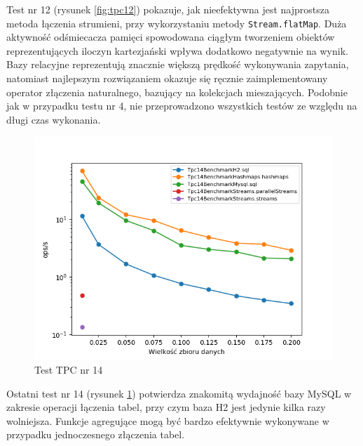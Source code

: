 \documentclass[12pt,twoside,openright]{extarticle}
\begin{document}
    Test nr 12 (rysunek \ref{fig:tpc12}) pokazuje, jak nieefektywna jest najprostsza metoda łączenia strumieni, przy wykorzystaniu metody \texttt{Stream.flatMap}. Duża aktywność odśmiecacza pamięci spowodowana ciągłym tworzeniem obiektów reprezentujących iloczyn kartezjański wpływa dodatkowo negatywnie na wynik. Bazy relacyjne reprezentują znacznie większą prędkość wykonywania zapytania, natomiast najlepszym rozwiązaniem okazuje się ręcznie zaimplementowany operator złączenia naturalnego, bazujący na kolekcjach mieszających. Podobnie jak w przypadku testu nr 4, nie przeprowadzono wszystkich testów ze względu na długi czas wykonania.

\newpage
\begin{figure}[H]
\centering
\includegraphics[width=15cm]{plots/Tpc14Benchmark}
\caption{Test TPC nr 14}
    \label{fig:tpc14}
\end{figure}

    Ostatni test nr 14 (rysunek \ref{fig:tpc14}) potwierdza znakomitą wydajność bazy MySQL w zakresie operacji łączenia tabel, przy czym baza H2 jest jedynie kilka razy wolniejsza. Funkcje agregujące mogą być bardzo efektywnie wykonywane w przypadku jednoczesnego złączenia tabel.
\end{document}
